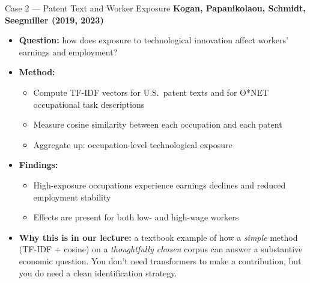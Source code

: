\begin{frame}{Case 2 --- Patent Text and Worker Exposure}
\textbf{Kogan, Papanikolaou, Schmidt, Seegmiller (2019, 2023)}

\medskip
\begin{itemize}
\item \textbf{Question:} how does exposure to technological innovation affect workers' earnings and employment?

\medskip
\item \textbf{Method:}
\begin{itemize}
    \item Compute TF-IDF vectors for U.S.\ patent texts and for O*NET occupational task descriptions
    \item Measure cosine similarity between each occupation and each patent
    \item Aggregate up: occupation-level technological exposure
\end{itemize}

\medskip
\item \textbf{Findings:}
\begin{itemize}
    \item High-exposure occupations experience earnings declines and reduced employment stability
    \item Effects are present for both low- and high-wage workers
\end{itemize}

\medskip
\item \textbf{Why this is in our lecture:} a textbook example of how a \emph{simple} method (TF-IDF + cosine) on a \emph{thoughtfully chosen} corpus can answer a substantive economic question. You don't need transformers to make a contribution, but you do need a clean identification strategy.
\end{itemize}
\end{frame}

